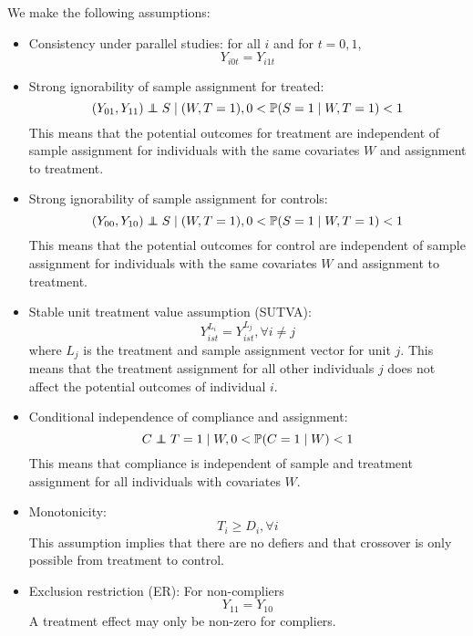 \documentclass{article}
\newcommand{\pr}{\mathbb{P}} %
\newcommand\independent{\protect\mathpalette{\protect\independenT}{\perp}}
\def\independenT#1#2{\mathrel{\rlap{$#1#2$}\mkern2mu{#1#2}}}
\theoremstyle{plain}
\begin{document}
We make the following assumptions:
\begin{itemize}
\item{Consistency under parallel studies: for all $i$ and for $t=0, 1$,
\begin{equation}\label{consistency}
Y_{i0t} = Y_{i1t}
\end{equation}}
\item{Strong ignorability of sample assignment for treated:
\begin{equation}\label{si_treat}
(Y_{01}, Y_{11}) \independent S \mid (W, T=1), 0 < \pr(S=1 \mid W, T=1) <1 
\end{equation}}
This means that the potential outcomes for treatment are independent of sample assignment for individuals with the same covariates $W$ and assignment to treatment.
\item{Strong ignorability of sample assignment for controls:
\begin{equation}\label{si_ctrl}
(Y_{00}, Y_{10}) \independent S \mid (W, T=1), 0 < \pr(S=1 \mid W, T=1) <1 
\end{equation}}
This means that the potential outcomes for control are independent of sample assignment for individuals with the same covariates $W$ and assignment to treatment.
\item{Stable unit treatment value assumption (SUTVA):
\begin{equation}\label{sutva}
Y_{ist}^{L_i} = Y_{ist}^{L_j},  \forall i \neq j
\end{equation}
where $L_j$ is the treatment and sample assignment vector for unit $j$.  This means that the treatment assignment for all other individuals $j$ does not affect the potential outcomes of individual $i$.}
\item{Conditional independence of compliance and assignment:
\begin{equation}\label{compl}
C \independent T=1 \mid W, 0 < \pr(C = 1 \mid W) < 1
\end{equation}
This means that compliance is independent of sample and treatment assignment for all individuals with covariates $W$.
}
\item{Monotonicity: 
\begin{equation}\label{monotonicity}
T_i \geq D_i, \forall i
\end{equation}
This assumption implies that there are no defiers and that crossover is only possible from treatment to control.}
\item{Exclusion restriction (ER): For non-compliers
\begin{equation}\label{ER}
Y_{11} = Y_{10}
\end{equation}  
A treatment effect may only be non-zero for compliers.}
\end{itemize}
\end{document}
